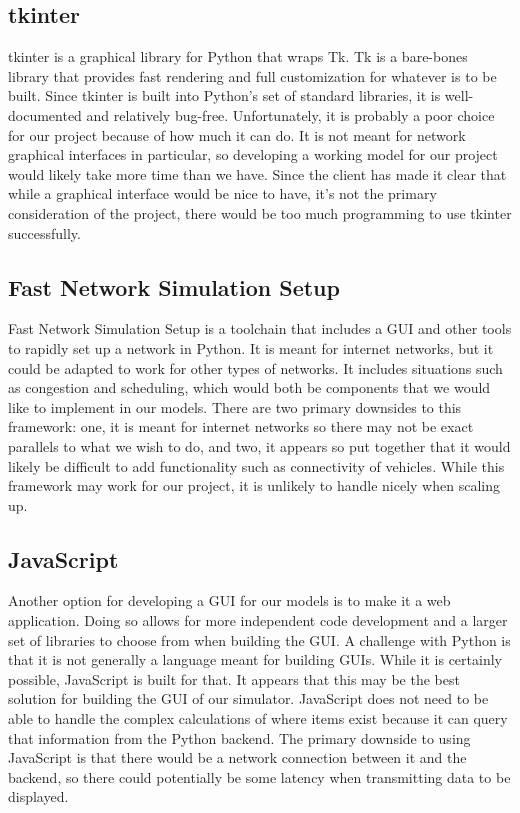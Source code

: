 \documentclass[10pt,letterpaper,draftclsnofoot,onecolumn]{IEEEtran}
\begin{document}
\subsection{tkinter \cite{tkinter}}
tkinter is a graphical library for Python that wraps Tk. Tk is a bare-bones library that provides fast rendering and full customization for whatever is to be built. Since tkinter is built into Python’s set of standard libraries, it is well-documented and relatively bug-free. Unfortunately, it is probably a poor choice for our project because of how much it can do. It is not meant for network graphical interfaces in particular, so developing a working model for our project would likely take more time than we have. Since the client has made it clear that while a graphical interface would be nice to have, it’s not the primary consideration of the project, there would be too much programming to use tkinter successfully.
\subsection{Fast Network Simulation Setup \cite{fnss}}
Fast Network Simulation Setup is a toolchain that includes a GUI and other tools to rapidly set up a network in Python. It is meant for internet networks, but it could be adapted to work for other types of networks. It includes situations such as congestion and scheduling, which would both be components that we would like to implement in our models. There are two primary downsides to this framework: one, it is meant for internet networks so there may not be exact parallels to what we wish to do, and two, it appears so put together that it would likely be difficult to add functionality such as connectivity of vehicles. While this framework may work for our project, it is unlikely to handle nicely when scaling up.
\subsection{JavaScript \cite{javascript}}
Another option for developing a GUI for our models is to make it a web application. Doing so allows for more independent code development and a larger set of libraries to choose from when building the GUI. A challenge with Python is that it is not generally a language meant for building GUIs. While it is certainly possible, JavaScript is built for that. It appears that this may be the best solution for building the GUI of our simulator. JavaScript does not need to be able to handle the complex calculations of where items exist because it can query that information from the Python backend. The primary downside to using JavaScript is that there would be a network connection between it and the backend, so there could potentially be some latency when transmitting data to be displayed.
\end{document}
